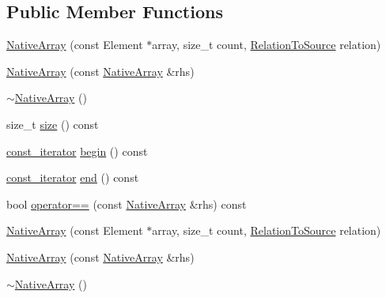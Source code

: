 \subsection*{Public Member Functions}
\begin{DoxyCompactItemize}
\item 
\hyperlink{classtesting_1_1internal_1_1_native_array_a568de999aca0fc0c2cc574fac2405872}{Native\-Array} (const Element $\ast$array, size\-\_\-t count, \hyperlink{namespacetesting_1_1internal_aec4f0eeb60b6b8af8dcf979578bbf3bb}{Relation\-To\-Source} relation)
\item 
\hyperlink{classtesting_1_1internal_1_1_native_array_abb346ac3040f5da733f594cc2d5958bc}{Native\-Array} (const \hyperlink{classtesting_1_1internal_1_1_native_array}{Native\-Array} \&rhs)
\item 
\hyperlink{classtesting_1_1internal_1_1_native_array_a55ab5948d473a487303dcf6e02ad1f60}{$\sim$\-Native\-Array} ()
\item 
size\-\_\-t \hyperlink{classtesting_1_1internal_1_1_native_array_a45de2485baac8bf148e2943828094a40}{size} () const 
\item 
\hyperlink{classtesting_1_1internal_1_1_native_array_a9ce7c8408460d7158a2870456d134557}{const\-\_\-iterator} \hyperlink{classtesting_1_1internal_1_1_native_array_a49c534d29034d9230372ada54ef961bb}{begin} () const 
\item 
\hyperlink{classtesting_1_1internal_1_1_native_array_a9ce7c8408460d7158a2870456d134557}{const\-\_\-iterator} \hyperlink{classtesting_1_1internal_1_1_native_array_a4957ad1ebf7c21eab07d5e0ae2bb17aa}{end} () const 
\item 
bool \hyperlink{classtesting_1_1internal_1_1_native_array_a60af8d9c429771ee131b5ddf7e06e3c9}{operator==} (const \hyperlink{classtesting_1_1internal_1_1_native_array}{Native\-Array} \&rhs) const 
\item 
\hyperlink{classtesting_1_1internal_1_1_native_array_a568de999aca0fc0c2cc574fac2405872}{Native\-Array} (const Element $\ast$array, size\-\_\-t count, \hyperlink{namespacetesting_1_1internal_aec4f0eeb60b6b8af8dcf979578bbf3bb}{Relation\-To\-Source} relation)
\item 
\hyperlink{classtesting_1_1internal_1_1_native_array_abb346ac3040f5da733f594cc2d5958bc}{Native\-Array} (const \hyperlink{classtesting_1_1internal_1_1_native_array}{Native\-Array} \&rhs)
\item 
\hyperlink{classtesting_1_1internal_1_1_native_array_a55ab5948d473a487303dcf6e02ad1f60}{$\sim$\-Native\-Array} ()
\item 

\end{DoxyCompactItemize}
